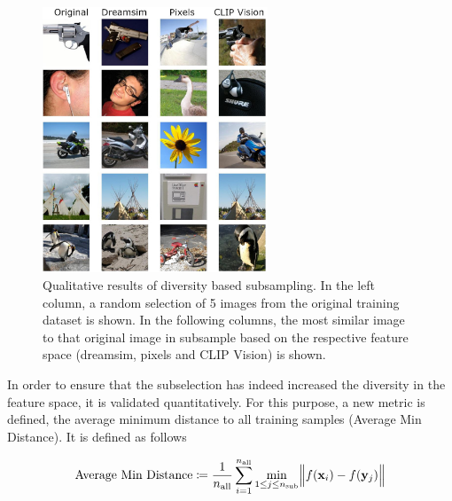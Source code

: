 \begin{figure}[ht]
  \centering
  \includegraphics[width=0.6\textwidth]{plots/dropout_similarity_plot.JPEG}
  \caption[Qualitative results of diversity based subsampling]{Qualitative results of diversity based subsampling. In the left column, a random selection of 5 images from the original training dataset is shown. In the following columns, the most similar image to that original image in subsample based on the respective feature space (dreamsim, pixels and CLIP Vision) is shown.}\label{fig:dropout_similarity_plot}
\end{figure}

In order to ensure that the subselection has indeed increased the diversity in the feature space, it is validated quantitatively. For this purpose, a new metric is defined, the average minimum distance to all training samples (Average Min Distance). It is defined as follows

\[
\text{Average Min Distance}
\coloneq \frac{1}{n_{\text{all}}}
  \sum_{i=1}^{n_{\text{all}}}
    \min_{1 \le j \le n_{\text{sub}}}
      \Bigl\lVert f(\mathbf{x}_i) - f(\mathbf{y}_j) \Bigr\rVert
\]



